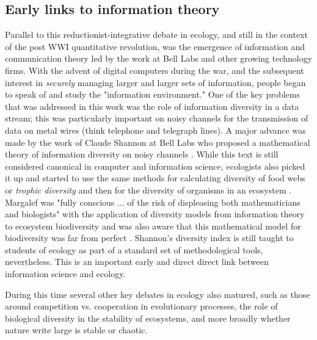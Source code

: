 \subsection{Early links to information theory}
Parallel to this reductionist-integrative debate in ecology, and still in the context of the post WWI quantitative revolution, was the emergence of information and communication theory led by the work at Bell Labs and other growing technology firms. With the advent of digital computers during the war, and the subsequent interest in \textit{securely} managing larger and larger sets of information, people began to speak of and study the "information environment." One of the key problems that was addressed in this work was the role of information diversity in a data stream; this was particularly important on noisy channels for the transmission of data on metal wires (think telephone and telegraph lines). A major advance was made by the work of Claude Shannon at Bell Labs who proposed a mathematical theory of information diversity on noisy channels \cite{shannon_1948}. While this text is still considered canonical in computer and information science, ecologists also picked it up and started to use the same methods for calculating diversity of food webs or \textit{trophic diversity} \cite{macarthur_1955} and then for the diversity of organisms in an ecosystem \cite{margalef_1957}. Margalef was "fully conscious ... of the risk of displeasing both mathematicians and biologists" with the application of diversity models from information theory to ecosystem biodiversity and was also aware that this mathematical model for biodiversity was far from perfect \cite{margalef_1957}. Shannon's diversity index is still taught to students of ecology as part of a standard set of methodological tools, nevertheless. This is an important early and direct direct link between information science and ecology.

During this time several other key debates in ecology also matured, such as those around competition vs. cooperation in evolutionary processes, the role of biological diversity in the stability of ecosystems, and more broadly whether nature write large is stable or chaotic. 

